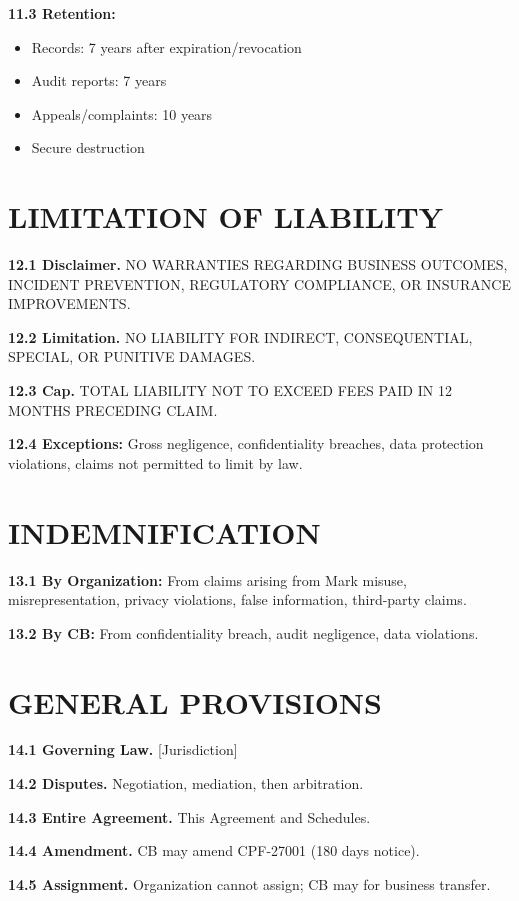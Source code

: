 \documentclass[11pt,a4paper]{article}
\begin{document}
\textbf{11.3 Retention:}
\begin{itemize}
\item Records: 7 years after expiration/revocation
\item Audit reports: 7 years
\item Appeals/complaints: 10 years
\item Secure destruction
\end{itemize}

\section{LIMITATION OF LIABILITY}

\textbf{12.1 Disclaimer.} NO WARRANTIES REGARDING BUSINESS OUTCOMES, INCIDENT PREVENTION, REGULATORY COMPLIANCE, OR INSURANCE IMPROVEMENTS.

\textbf{12.2 Limitation.} NO LIABILITY FOR INDIRECT, CONSEQUENTIAL, SPECIAL, OR PUNITIVE DAMAGES.

\textbf{12.3 Cap.} TOTAL LIABILITY NOT TO EXCEED FEES PAID IN 12 MONTHS PRECEDING CLAIM.

\textbf{12.4 Exceptions:} Gross negligence, confidentiality breaches, data protection violations, claims not permitted to limit by law.

\section{INDEMNIFICATION}

\textbf{13.1 By Organization:} From claims arising from Mark misuse, misrepresentation, privacy violations, false information, third-party claims.

\textbf{13.2 By CB:} From confidentiality breach, audit negligence, data violations.

\section{GENERAL PROVISIONS}

\textbf{14.1 Governing Law.} [Jurisdiction]

\textbf{14.2 Disputes.} Negotiation, mediation, then arbitration.

\textbf{14.3 Entire Agreement.} This Agreement and Schedules.

\textbf{14.4 Amendment.} CB may amend CPF-27001 (180 days notice).

\textbf{14.5 Assignment.} Organization cannot assign; CB may for business transfer.
\end{document}
